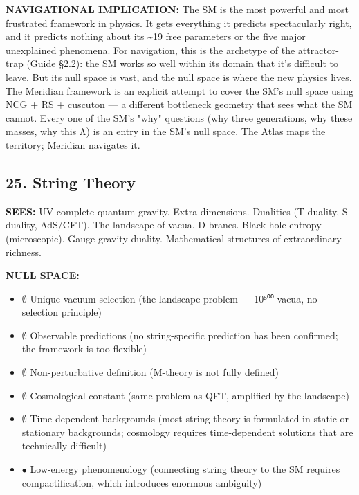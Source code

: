\textbf{NAVIGATIONAL IMPLICATION:} The SM is the most powerful and most frustrated framework in physics. It gets everything it predicts spectacularly right, and it predicts nothing about its \textasciitilde{}19 free parameters or the five major unexplained phenomena. For navigation, this is the archetype of the attractor-trap (Guide §2.2): the SM works so well within its domain that it's difficult to leave. But its null space is vast, and the null space is where the new physics lives. The Meridian framework is an explicit attempt to cover the SM's null space using NCG + RS + cuscuton — a different bottleneck geometry that sees what the SM cannot. Every one of the SM's "why" questions (why three generations, why these masses, why this Λ) is an entry in the SM's null space. The Atlas maps the territory; Meridian navigates it.


\bigskip\noindent\makebox[\textwidth]{\color{rulegray}\rule{5cm}{0.3pt}}\bigskip


\subsection*{25. String Theory}


\textbf{SEES:} UV-complete quantum gravity. Extra dimensions. Dualities (T-duality, S-duality, AdS/\allowbreak CFT). The landscape of vacua. D-branes. Black hole entropy (microscopic). Gauge-gravity duality. Mathematical structures of extraordinary richness.


\textbf{NULL SPACE:}

\begin{itemize}[nosep,leftmargin=*]
  \item $\emptyset$ Unique vacuum selection (the landscape problem — 10⁵⁰⁰ vacua, no selection principle)
  \item $\emptyset$ Observable predictions (no string-specific prediction has been confirmed; the framework is too flexible)
  \item $\emptyset$ Non-perturbative definition (M-theory is not fully defined)
  \item $\emptyset$ Cosmological constant (same problem as QFT, amplified by the landscape)
  \item $\emptyset$ Time-dependent backgrounds (most string theory is formulated in static or stationary backgrounds; cosmology requires time-dependent solutions that are technically difficult)
  \item $\bullet$ Low-energy phenomenology (connecting string theory to the SM requires compactification, which introduces enormous ambiguity)
\end{itemize}


